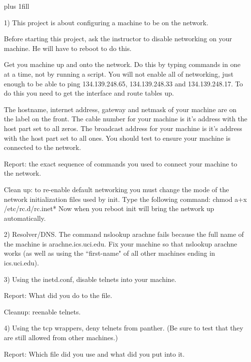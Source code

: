 
\rightskip=0pt plus 1fill

\parindent 0pt

1) This project is about configuring a machine to be on the network.

Before starting this project, ask the instructor to disable networking
on your machine. He will have to reboot to do this.

Get you machine up and onto the network.
Do this by typing commands in one at a time, not by running a script.
You will not enable all of networking, just enough to be
able to ping {\ltt{}134.139.248.65}, {\ltt{}134.139.248.33}
and {\ltt{}134.139.248.17}.
To do this you need to get the interface and route tables up.

The hostname, internet address, gateway and netmask of your machine are
on the label on the front.
The cable number for your machine is it's address with the host
part set to all zeros.
The broadcast address for your machine is it's address with the host
part set to all ones.
You should test to ensure your machine is connected to the network.

Report: the exact sequence of commands you used to connect your machine
to the network.

Clean up: to re-enable default networking you must change the mode
of the network initialization files used by {\ltt{}init}.
Type the following command:
\hfill\break
{\ltt{}chmod a+x /etc/rc.d/rc.inet*}
\hfill\break
Now when you reboot {\ltt{}init} will bring the network up automatically.

2) Resolver/DNS. The command {\ltt{}nslookup arachne} fails because the full
name of the machine is {\ltt{}arachne.ics.uci.edu}.
Fix your machine so that {\ltt{}nslookup arachne} works (as well as using
the ``first-name" of all other machines ending in {\ltt{}ics.uci.edu}).

3) Using the {\ltt{}inetd.conf}, disable telnets into your machine.

Report: What did you do to the file.

Cleanup: reenable telnets.

4) Using the tcp wrappers, deny telnets from {\ltt{}panther}. (Be sure to test
that they are still allowed from other machines.)

Report: Which file did you use and what did you put into it.

